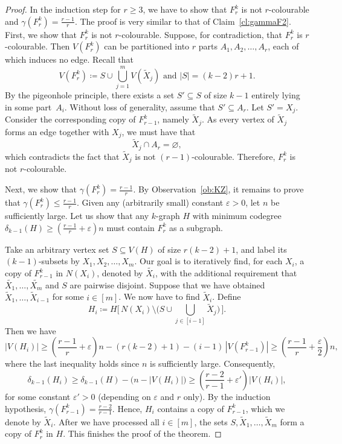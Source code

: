 \documentclass[11pt,a4paper]{article}
\theoremstyle{remark}
\begin{document}
\begin{proof}
In the induction step for $r\ge 3$, we have to show that  $F^k_{r}$ is not $r$-colourable and $\gamma(F^k_{r}) =\frac{r-1}{r}$. The proof is very similar to that of Claim~\ref{cl:gammaF2}. 
First, we show that $F^k_r$ is not $r$-colourable.  Suppose, for contradiction, that $F^k_r$ is $r$-colourable. Then $V(F^k_r)$ can be partitioned into $r$ parts $A_1,A_2,\dots,A_r$, each of which induces no edge. Recall that \[V(F^k_r) \coloneqq S\cup \bigcup^m_{j=1}V\left(\tilde{X}_j\right) \text{ and } |S| = (k-2)r+1.\]
By the pigeonhole principle, there exists a set $S' \subseteq S$ of size $k-1$ entirely lying in some part~$A_i$.  Without loss of generality, assume that $S'\subseteq A_r$. Let $S'=X_j$. Consider the corresponding copy of $F^k_{r-1}$, namely $\tilde{X}_j$.
As every vertex of $\tilde{X}_j$ forms an edge together with $X_j$, we must have that
\[
\tilde{X}_j \cap A_r = \varnothing,
\]
which contradicts the fact that $\tilde{X}_j$ is not $(r-1)$-colourable.
Therefore, $F^k_r$ is not $r$-colourable.


Next, we show that $\gamma(F^k_r)=\frac{r-1}{r}$. By Observation~\ref{ob:KZ}, it remains to prove that $\gamma(F^k_r)\le \frac{r-1}{r}$. 
Given any (arbitrarily small) constant $\varepsilon>0$, let $n$ be sufficiently large. Let us show that any $k$-graph $H$ with minimum codegree $\delta_{k-1}(H)\ge (\frac{r-1}{r}+\varepsilon)n$ must contain $F^k_r$ as a subgraph.

Take an arbitrary vertex set $S \subseteq V(H)$ of size $r(k-2)+1$, and label its $(k-1)$-subsets by $X_1,X_2,\dots,X_m$. Our goal is to iteratively find, for each $X_i$, a copy of $F^k_{r-1}$ in $N(X_{i})$, denoted by $\tilde{X_i}$, with the additional requirement that $\tilde{X_1},\dots,\tilde{X_m}$ and $S$ are pairwise disjoint. Suppose that we have obtained $\tilde{X}_1,\dots,\tilde{X}_{i-1}$ for some $i\in[m]$.
We now have to find $\tilde{X}_{i}$.
Define
\[
H_i \coloneqq  H\Big[\, N(X_{i}) \setminus \Big(S \cup \bigcup_{j\in[i-1]} \tilde{X}_j\Big) \,\Big].
\]
Then we have
\[
|V(H_i)|
\ge \left(\frac{r-1}{r}+\varepsilon\right)n  - (r(k-2)+1)
- (i-1)\,|V(F_{r-1}^k)|
\ge \left(\frac{r-1}{r}+\frac{\varepsilon}{2}\right)n,
\]
where the last inequality holds since $n$ is  sufficiently large.
Consequently,
\[
\delta_{k-1}(H_i)
\ge \delta_{k-1}(H) - \bigl(n-|V(H_i)|\bigr)
\ge \left(\frac{r-2}{r-1}+\varepsilon'\right)|V(H_i)|,
\]
for some constant $\varepsilon'>0$ (depending on $\varepsilon$ and $r$ only).
By the induction hypothesis, $\gamma(F^k_{r-1})=\frac{r-2}{r-1}$.
Hence, $H_i$ contains a copy of $F^k_{r-1}$, which we denote by $\tilde{X}_i$.
After we have processed all $i\in[m]$, the sets $S, \tilde{X}_1,\dots,\tilde{X}_m$ form a copy of $F^k_r$ in $H$. This finishes the proof of the theorem.
\end{proof}
\end{document}
